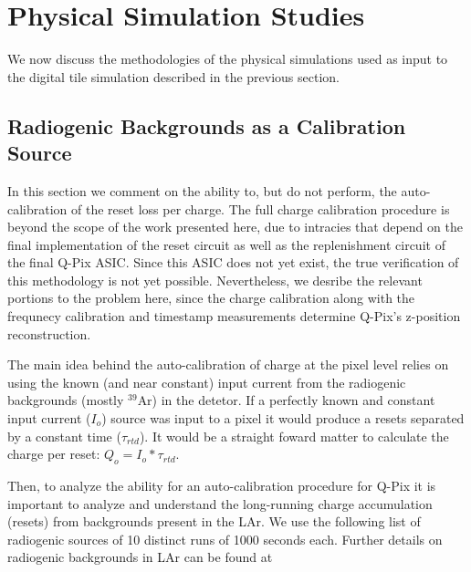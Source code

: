 \section{Physical Simulation Studies}

We now discuss the methodologies of the physical simulations used as input to the digital tile simulation described in the previous section.

\subsection{Radiogenic Backgrounds as a Calibration Source}

In this section we comment on the ability to, but do not perform, the auto-calibration of the reset loss per charge.
The full charge calibration procedure is beyond the scope of the work presented here, due to intracies that depend on the final implementation of the reset circuit as well as the replenishment circuit of the final Q-Pix ASIC.
Since this ASIC does not yet exist, the true verification of this methodology is not yet possible.
Nevertheless, we desribe the relevant portions to the problem here, since the charge calibration along with the frequnecy calibration and timestamp measurements determine Q-Pix's z-position reconstruction.

The main idea behind the auto-calibration of charge at the pixel level relies on using the known (and near constant) input current from the radiogenic backgrounds (mostly $^{39}$Ar) in the detetor. 
If a perfectly known and constant input current ($I_{o}$) source was input to a pixel it would produce a resets separated by a constant time ($\tau_{rtd}$).
It would be a straight foward matter to calculate the charge per reset: $Q_{o} = I_{o}*\tau_{rtd}$.

Then, to analyze the ability for an auto-calibration procedure for Q-Pix it is important to analyze and understand the long-running charge accumulation (resets) from backgrounds present in the LAr.
We use the following list of radiogenic sources of 10 distinct runs of 1000 seconds each.
Further details on radiogenic backgrounds in LAr can be found at~\citep{DUNE-FD_TDRv4:Abi_2020, ar39_backgrounds, phd_backgrounds}

